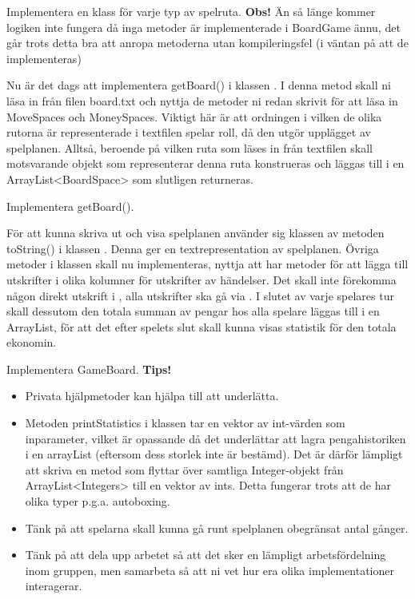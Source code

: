 \Subtask Implementera en klass för varje typ av spelruta.
\newline
\newline
\noindent
\textbf{Obs!} Än så länge kommer logiken inte fungera då inga metoder är implementerade i BoardGame ännu, det går trots detta bra att anropa metoderna utan kompileringsfel (i väntan på att de implementeras)

\Task Nu är det dags att implementera getBoard() i klassen . I denna metod skall ni läsa in från filen board.txt och nyttja de metoder ni redan skrivit för att läsa in MoveSpaces och MoneySpaces. Viktigt här är att ordningen i vilken de olika rutorna är representerade i textfilen spelar roll, då den utgör upplägget av spelplanen. Alltså, beroende på vilken ruta som läses in från textfilen skall motsvarande objekt som representerar denna ruta konstrueras och läggas till i en ArrayList<BoardSpace> som slutligen returneras.

\Subtask Implementera getBoard().

\Task För att kunna skriva ut och visa spelplanen använder sig klassen   av metoden toString() i klassen . Denna ger en textrepresentation av spelplanen. Övriga metoder i klassen  skall nu implementeras, nyttja att   har metoder för att lägga till utskrifter i olika kolumner för utskrifter av händelser. Det skall inte förekomma någon direkt utskrift i  , alla utskrifter ska gå via . I slutet av varje spelares tur skall dessutom den totala summan av pengar hos alla spelare läggas till i en ArrayList, för att det efter spelets slut skall kunna visas statistik för den totala ekonomin.

\Subtask Implementera GameBoard.
\newline
\newline
\textbf{Tips!} 

\begin{itemize}
\item Privata hjälpmetoder kan hjälpa till att underlätta.
\item Metoden printStatistics i klassen  tar en vektor av int-värden som inparameter, vilket är opassande då det underlättar att lagra pengahistoriken i en arrayList (eftersom dess storlek inte är bestämd). Det är därför lämpligt att skriva en metod som flyttar över samtliga Integer-objekt från ArrayList<Integers> till en vektor av ints. Detta fungerar trots att de har olika typer p.g.a. autoboxing. 
\item Tänk på att spelarna skall kunna gå runt spelplanen obegränsat antal gånger.
\item Tänk på att dela upp arbetet så att det sker en lämpligt arbetsfördelning inom gruppen, men samarbeta så att ni vet hur era olika implementationer interagerar.
\end{itemize}




